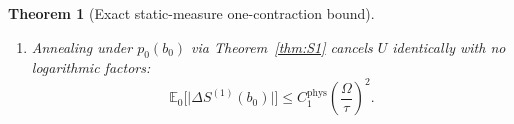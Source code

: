 \documentclass[11pt]{article}
\newtheorem{theorem}{Theorem}[section]
\theoremstyle{definition}
\theoremstyle{remark}
\DeclareMathOperator{\phys}{phys}
\newcommand{\E}{\mathbb{E}}
\begin{document}
\begin{theorem}[Exact static-measure one-contraction bound]
\begin{enumerate}[label=(\roman*),leftmargin=2.2em]
\begin{align}
\label{eq:C1_pointwise_parts}
\end{align}
and hence
\begin{equation}
\bigl|\Delta S^{(1)}(b_0)\bigr| \le C_1^{\phys}\, \frac{U\Omega^2}{\tau^2}\left(\frac{1}{V}\sum_{z\in\Lambda} (\chi_{b_0})_{zz}\right), \qquad C_1^{\phys} := \frac{1}{24} + \frac{\zeta(3)}{8\pi^3} \approx 0.0465127.
\label{eq:C1_pointwise}
\end{equation}
\item Annealing under $p_0(b_0)$ via Theorem~\ref{thm:S1} cancels $U$ identically with no logarithmic factors:
\begin{equation}
\E_0\bigl[\bigl|\Delta S^{(1)}(b_0)\bigr|\bigr] \le C_1^{\phys} \left(\frac{\Omega}{\tau}\right)^2.
\label{eq:C1_annealed}
\end{equation}
\end{enumerate}
\end{theorem}
\end{document}
